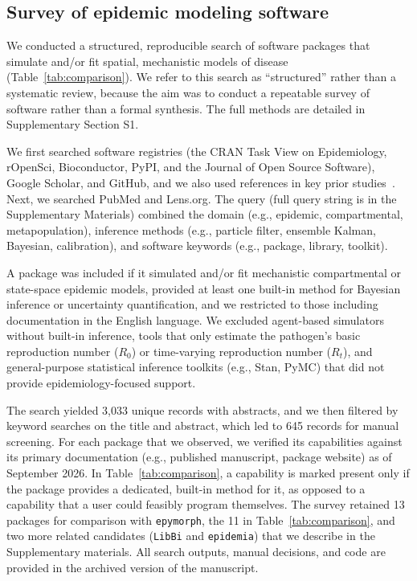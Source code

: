 \subsection{Survey of epidemic modeling software}\label{sec:methods-survey}

We conducted a structured, reproducible search of software packages that simulate and/or fit spatial, mechanistic models of disease (Table~\ref{tab:comparison}).
We refer to this search as ``structured'' rather than a systematic review, because the aim was to conduct a repeatable survey of software rather than a formal synthesis.
The full methods are detailed in Supplementary Section S1.

We first searched software registries (the CRAN Task View on Epidemiology, rOpenSci, Bioconductor, PyPI, and the Journal of Open Source Software), Google Scholar, and GitHub, and we also used references in key prior studies~\citep{king_statistical_2016,asfaw_tutorial_2024,lemaitre_flepimop_2024}.
Next, we searched PubMed and Lens.org.
The query (full query string is in the Supplementary Materials) combined the domain (e.g., epidemic, compartmental, metapopulation), inference methods (e.g., particle filter, ensemble Kalman, Bayesian, calibration), and software keywords (e.g., package, library, toolkit).

A package was included if it simulated and/or fit mechanistic compartmental or state-space epidemic models, provided at least one built-in method for Bayesian inference or uncertainty quantification, and we restricted to those including documentation in the English language.
We excluded agent-based simulators without built-in inference, tools that only estimate the pathogen's basic reproduction number ($R_0$) or time-varying reproduction number ($R_t$), and general-purpose statistical inference toolkits (e.g., Stan, PyMC) that did not provide epidemiology-focused support.

The search yielded 3,033 unique records with abstracts, and we then filtered by keyword searches on the title and abstract, which led to 645 records for manual screening.
For each package that we observed, we verified its capabilities against its primary documentation (e.g., published manuscript, package website) as of September 2026.
In Table~\ref{tab:comparison}, a capability is marked present only if the package provides a dedicated, built-in method for it, as opposed to a capability that a user could feasibly program themselves.
The survey retained 13 packages for comparison with \texttt{epymorph}, the 11 in Table~\ref{tab:comparison}, and two more related candidates (\texttt{LibBi} and \texttt{epidemia}) that we describe in the Supplementary materials.
All search outputs, manual decisions, and code are provided in the archived version of the manuscript.

